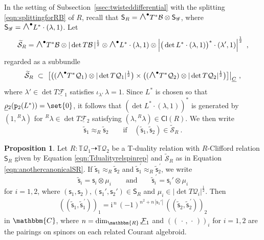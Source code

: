 \documentclass[a4paper, reqno, 11pt]{amsart}
\numberwithin{equation}{section}
\theoremstyle{definition}
\newtheorem{proposition}[equation]{Proposition}
\newcommand{\red}[1]{\underline{#1}}
\newcommand{\ii}{\mathrm{i}}
\newcommand{\rmp}{\mathtt{p}}
\newcommand{\IC}{\mathbbm{C}}
\newcommand{\IR}{\mathbbm{R}}
\newcommand{\IT}{\mathbb{T}}
\newcommand{\Cl}{\mathsf{Cl}}
\newcommand{\cS}{{\mathcal S}}
\newcommand{\cB}{{\mathcal B}}
\newcommand{\cQ}{{\mathcal Q}}
\newcommand{\cF}{{\mathcal F}}
\newcommand{\ccG}{{\mathscr G}}
\newcommand{\sfS}{{\mathsf{S}}}
\newcommand{\sfs}{{\mathsf{s}}}
\newcommand{\midwedge}{\text {\Large$\wedge$}}
\newcommand{\rel}{\dashrightarrow}
\theoremstyle{remark}
\begin{document}
In the setting of Subsection~\ref{ssec:twisteddifferential} with the splitting \eqref{eqn:splittingforRB} of $R$, recall  that $\sfS_R = \midwedge^\bullet T^*\cB \otimes \sfS_\ccG$, where $\sfS_\ccG = \midwedge^\bullet L^* \cdot( \lambda, 1)$. Let
\begin{align}\label{eqn:anothercanonicalSR}
    \widetilde{\cS}_R  = \midwedge^\bullet T^*\cB \otimes |\det T\cB\,|^{\frac12} \otimes \midwedge^\bullet L^* \cdot (\lambda, 1) \otimes \left\vert\big(\det L^* \cdot (\lambda, 1)\big)^* \cdot (\lambda',1)\right\vert^{\frac12}\ ,
\end{align}
regarded as a subbundle $$\widetilde \cS_R \ \subset \ \big[\big((\midwedge^\bullet T^* \cQ_1) \otimes |\det T \cQ_1|^{\frac12}\big) \times \big((\midwedge^\bullet T^* \cQ_2) \otimes |\det T \cQ_2|^{\frac12}\big)\big]\big|_{\red C} \ , $$ 
where $\lambda'\in \det T\red \cF{}_1$ satisfies $\iota_{\lambda'} \, \lambda = 1$.
Since $L^*$ is chosen so that $\red\rho{}_2(\rmp_2(L^*)) = \set{0}$, it follows that $(\det L^* \cdot (\lambda ,1 ))^*$ is generated by $(1, {}^R \lambda)$ for ${}^R \lambda \in \det T\red \cF{}_2$ satisfying $(\lambda, {}^R\lambda)\in \Cl(R)$. We then write $$\widetilde \sfs_1 \approx_R \widetilde \sfs_2 \qquad \text{if} \quad (\widetilde \sfs_1 , \widetilde \sfs_2)  \in  \widetilde \cS_R \ . $$

\begin{proposition} \label{prop:pairingspinor}
    Let $R\colon\IT \cQ_1 \rel \IT \cQ_2$ be a T-duality relation with $R$-Clifford relation $\sfS_R$ given by Equation \eqref{eqn:Tdualityrelspinrep} and $\widetilde \cS_R$ as in Equation \eqref{eqn:anothercanonicalSR}. 
    If $\widetilde \sfs_1 \approx_R \widetilde \sfs_2$ and $\widetilde\sfs_1^{\,\prime} \approx_{R} \widetilde\sfs_2^{\,\prime}$, we write  $$\widetilde\sfs_i=\sfs_i\otimes\mu_i \qquad \text{and} \qquad \widetilde\sfs_i^{\,\prime}=\sfs_i'\otimes\mu_i$$ for $i=1,2$, where $(\sfs_1,\sfs_2),(\sfs_1',\sfs_2')\in\sfS_R$ and $\mu_i\in|\det T\cQ_i|^{\frac12}$. Then
    \begin{align}
        (\!(\widetilde\sfs_1, \widetilde\sfs_1^{\,\prime})\!)_1 = \ii^{\,n}\,(-1)^{n^2 + n\, |\sfs_1'|}\, (\!(\widetilde\sfs_2, \widetilde\sfs_2^{\,\prime})\!)_2
    \end{align}
    in $\IC$, where $n=\dim_\IR\red\cF{}_1$ and $(\!(\, \cdot \, , \, \cdot \,)\!)_i$ for $i=1,2$ are the pairings on spinors on each related Courant algebroid.
\end{proposition}
\end{document}
